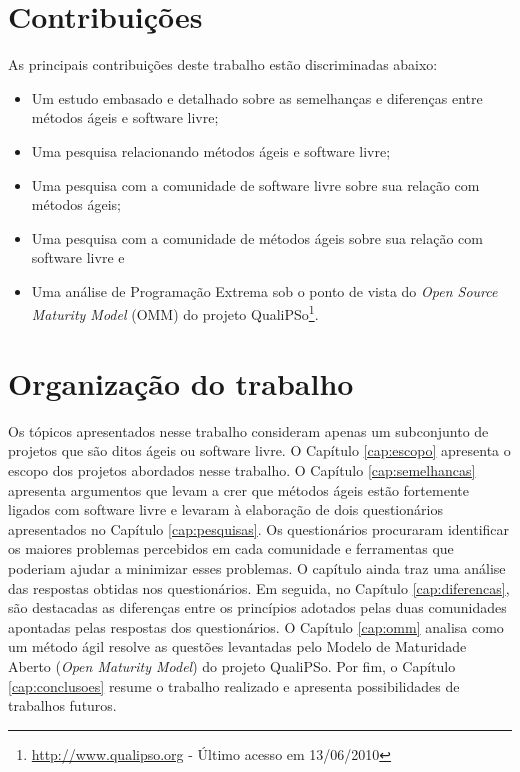 \section{Contribuições}
\label{sec:contribucoes}

As principais contribuições deste trabalho estão discriminadas abaixo:

\begin{itemize}
\item Um estudo embasado e detalhado sobre as semelhanças e diferenças
  entre métodos ágeis e software livre;
\item Uma pesquisa relacionando métodos ágeis e software livre;
\item Uma pesquisa com a comunidade de software livre sobre sua
  relação com métodos ágeis;
\item Uma pesquisa com a comunidade de métodos ágeis sobre sua relação
  com software livre e
\item Uma análise de Programação Extrema \cite{XP01} sob o ponto de
  vista do \emph{Open Source Maturity Model} (OMM) do projeto
  QualiPSo\footnote{\url{http://www.qualipso.org} - Último acesso em
    13/06/2010}.
\end{itemize}

\section{Organização do trabalho}
\label{sec:organizacao_trabalho}

Os tópicos apresentados nesse trabalho consideram apenas um
subconjunto de projetos que são ditos ágeis ou software livre. O
Capítulo \ref{cap:escopo} apresenta o escopo dos projetos abordados
nesse trabalho. O Capítulo \ref{cap:semelhancas} apresenta argumentos
que levam a crer que métodos ágeis estão fortemente ligados com
software livre e levaram à elaboração de dois questionários
apresentados no Capítulo \ref{cap:pesquisas}. Os questionários
procuraram identificar os maiores problemas percebidos em cada
comunidade e ferramentas que poderiam ajudar a minimizar esses
problemas. O capítulo ainda traz uma análise das respostas obtidas nos
questionários.  Em seguida, no Capítulo \ref{cap:diferencas}, são
destacadas as diferenças entre os princípios adotados pelas duas
comunidades apontadas pelas respostas dos questionários. O Capítulo
\ref{cap:omm} analisa como um método ágil resolve as questões
levantadas pelo Modelo de Maturidade Aberto ({\it Open Maturity
  Model}) do projeto QualiPSo.  Por fim, o Capítulo
\ref{cap:conclusoes} resume o trabalho realizado e apresenta
possibilidades de trabalhos futuros.
